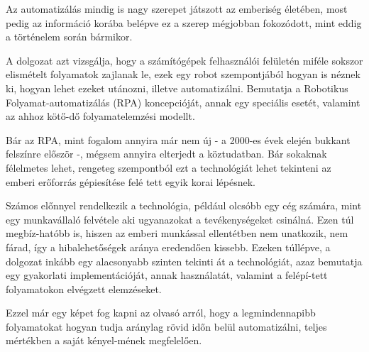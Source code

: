 
Az automatizálás mindig is nagy szerepet játszott az emberiség életében, most pedig az információ korába belépve ez a szerep mégjobban fokozódott, mint eddig a történelem során bármikor.

A dolgozat azt vizsgálja, hogy a számítógépek felhasználói felületén miféle sokszor elismételt folyamatok zajlanak le, ezek egy robot szempontjából hogyan is néznek ki, hogyan lehet ezeket utánozni, illetve automatizálni. Bemutatja a Robotikus Folyamat\hyp{}automatizálás (RPA) koncepcióját, annak egy speciális esetét, valamint az ahhoz kötő\hyp{}dő folyamatelemzési modellt.

Bár az RPA, mint fogalom annyira már nem új - a 2000-es évek elején bukkant felszínre először -, mégsem annyira elterjedt a köztudatban. Bár sokaknak félelmetes lehet, rengeteg szempontból ezt a technológiát lehet tekinteni az emberi erőforrás gépiesítése felé tett egyik korai lépésnek.

Számos előnnyel rendelkezik a technológia, például olcsóbb egy cég számára, mint egy munkavállaló felvétele aki ugyanazokat a tevékenységeket csinálná. Ezen túl megbíz\hyp{}hatóbb is, hiszen az emberi munkással ellentétben nem unatkozik, nem fárad, így a hibalehetőségek aránya eredendően kissebb.
\newline\newline
Ezeken túllépve, a dolgozat inkább egy alacsonyabb szinten tekinti át a technológiát, azaz bemutatja egy gyakorlati implementációját, annak használatát, valamint a felépí\hyp{}tett folyamatokon elvégzett elemzéseket.

Ezzel már egy képet fog kapni az olvasó arról, hogy a legmindennapibb folyamatokat hogyan tudja aránylag rövid időn belül automatizálni, teljes mértékben a saját kényel\hyp{}mének megfelelően.